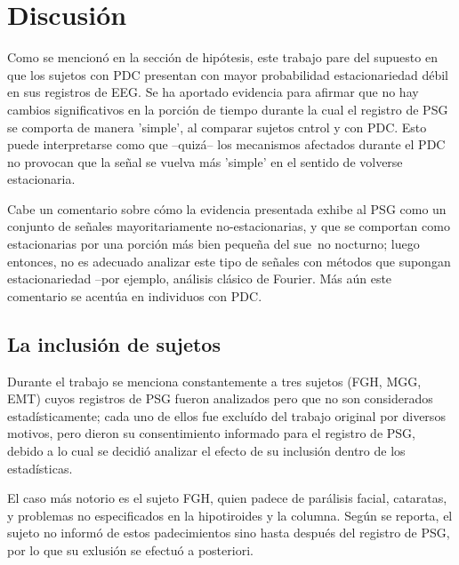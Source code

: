 \documentclass[12pt,a4paper]{mitthesis}
\begin{document}

\section{Discusi\'on}

Como se mencion\'o en la secci\'on de hip\'otesis, este trabajo pare del supuesto en que los
sujetos con PDC presentan con mayor probabilidad estacionariedad d\'ebil en sus registros de EEG.
Se ha aportado evidencia para afirmar que no hay cambios significativos en la porci\'on de tiempo 
durante la cual el registro de PSG se comporta de manera 'simple', al comparar sujetos cntrol y con
PDC. Esto puede interpretarse como que --quiz\'a-- los mecanismos afectados durante el PDC no 
provocan que la se\~nal se vuelva m\'as 'simple' en el sentido de volverse estacionaria.

Cabe un comentario sobre c\'omo la evidencia presentada exhibe al PSG como un conjunto de se\~nales 
mayoritariamente no-estacionarias, y que se comportan como estacionarias por una porci\'on m\'as
bien peque\~na del sue~no nocturno; luego entonces, no es adecuado analizar este tipo de se\~nales 
con m\'etodos que supongan estacionariedad --por ejemplo, an\'alisis cl\'asico de Fourier. 
M\'as a\'un este comentario se acent\'ua en individuos con PDC.

\subsection{La inclusi\'on de sujetos}

Durante el trabajo se menciona constantemente a tres sujetos (FGH, MGG, EMT) cuyos registros de PSG 
fueron analizados pero que no son considerados estad\'isticamente; cada uno de ellos fue exclu\'ido 
del trabajo original \cite{VazquezTagle16} por diversos motivos, pero dieron su consentimiento 
informado para el registro de PSG, debido a lo cual se decidi\'o analizar el efecto de su 
inclusi\'on dentro de los estad\'isticas.

El caso m\'as notorio es el sujeto FGH, quien padece de par\'alisis facial, cataratas, y problemas 
no especificados en la hipotiroides y la columna. Seg\'un se reporta, el sujeto no inform\'o de 
estos padecimientos sino hasta despu\'es del registro de PSG, por lo que su exlusi\'on se efectu\'o 
a posteriori.
\end{document}
